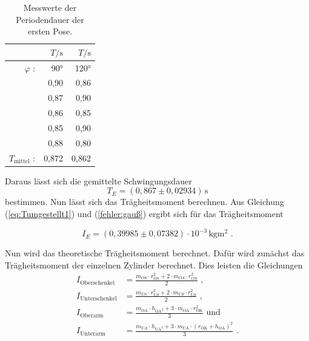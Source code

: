 \begin{table}[H]
  \centering
  \caption{Messwerte der Periodendauer der ersten Pose.}
  \label{tab:PeriodendauerPose1}
  \begin{tabular}{rrr}
    \toprule
     & $T / \unit\second$ &  $T / \unit\second$  \\
    \midrule
    $\varphi$ : & 90° & 120° \\
    \midrule
          & 0,90 &        0,86 \\
          & 0,87 &        0,90 \\
          & 0,86 &        0,85 \\
          & 0,85 &        0,90 \\
          & 0,88 &        0,80 \\
    \midrule
    $T_{\text{mittel}}$ : & 0,872 & 0,862 \\
    \bottomrule
    \end{tabular}
\end{table}

Daraus lässt sich die gemittelte Schwingungsdauer
\begin{equation*}
  T_E = (0,867 \pm 0,02934) \, \unit\second
\end{equation*}
bestimmen.
Nun lässt sich das Trägheitsmoment berechnen.
Aus Gleichung (\ref{eq:Tumgestellt1}) und (\ref{fehler:gauß}) ergibt sich für das Trägheitsmoment

\begin{equation*}
  I_E =( 0,39985 \pm 0,07382) \cdot 10^{-3}  %
  \, \unit{\kilo\gram\meter\squared} \text{ .}
\end{equation*}

Nun wird das theoretische Trägheitsmoment berechnet.
Dafür wird zunächst das Trägheitsmoment der einzelnen Zylinder berechnet.
Dies leisten die Gleichungen
\begin{align*} \label{I_Puppe}
  I_{\text{Oberschenkel}} &= \frac{m_{\text{OS}} \cdot r_{\text{OS}}^2 + 2 \cdot m_{OS} \cdot r_{OS}^2} {2}  \text{ ,}\\
  I_{\text{Unterschenkel}} &= \frac{m_{\text{US}} \cdot r_{\text{US}}^2 + 2 \cdot m_{US} \cdot r_{US}^2} {2}  \text{ ,}\\
  I_{\text{Oberarm}} &= \frac{m_{\text{OA}} \cdot h_{\text{OA}^2} + 3 \cdot m_{\text{OA}} \cdot r_{\text{OK}}^2} {3}  \text{ und}\\
  I_{\text{Unterarm}} &= \frac{m_{\text{UA}} \cdot h_{\text{UA}^2} + 3 \cdot m_{\text{UA}} \cdot \left( r_{\text{OK}} + h_{\text{OA}}\right)^2} {3} \text{ .} \\
\end{align*}

